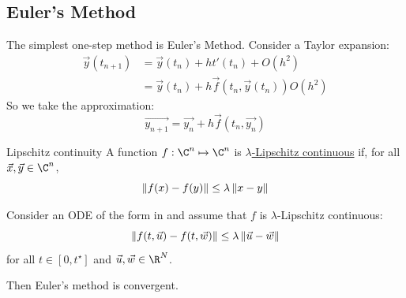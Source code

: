 \documentclass[../Main.tex]{subfiles}
\begin{document}
\subsection{Euler's Method}
The simplest one-step method is Euler's Method. Consider a Taylor expansion:
\begin{align*}
    \vec{y}(t_{n+1}) &= \vec{y}(t_n) + ht'(t_n) + O(h^2) \\
    &= \vec{y}(t_n) + h \vec{f}(t_n, \vec{y}(t_n)) O(h^2)
\end{align*}
So we take the approximation:
\begin{equation}
    \vec{y_{n+1}} = \vec{y_n} + h \vec{f}(t_n, \vec{y_n})
    \label{eqnEulerMethod}
\end{equation}
\begin{definition}{Lipschitz continuity}
    A function $f : \C^n \mapsto \C^n$ is \underline{$\lambda$-Lipschitz continuous} if, for all $\vec{x}, \vec{y} \in \C^n$,
    \begin{equation*}
        \left\|f(x) - f(y)\right\| \leq \lambda \left\|x - y\right\|
    \end{equation*}
\end{definition}
\begin{theorem}
    Consider an ODE of the form in  and assume that $f$ is $\lambda$-Lipschitz continuous:
    \begin{equation*}
        \left\|f(t, \vec{u}) - f(t, \vec{w})\right\| \leq \lambda \left\|\vec{u} - \vec{w}\right\|
    \end{equation*}
    for all $t \in [0, t^\star]$ and $\vec{u}, \vec{w} \in \R^N$.

    Then Euler's method is convergent.
    \label{thmEulerConvergence}
\end{theorem}
\end{document}
